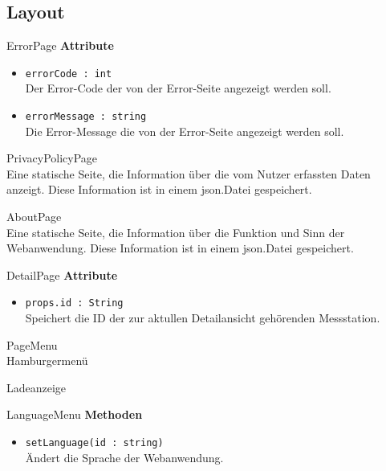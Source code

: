 \subsection{Layout}

    \begin{Class}{ErrorPage}
        \textbf{Attribute}
        \begin{itemize}
            \item \texttt{errorCode : int}
            \\Der Error-Code der von der Error-Seite angezeigt werden soll.
            \item \texttt{errorMessage : string}
            \\Die Error-Message die von der Error-Seite angezeigt werden soll.
        \end{itemize}
    \end{Class}

    \begin{Class}{PrivacyPolicyPage}
       \\Eine statische Seite, die Information über die vom Nutzer erfassten Daten anzeigt. Diese Information ist in einem json.Datei gespeichert.
    \end{Class}

    \begin{Class}{AboutPage}
       \\Eine statische Seite, die Information über die Funktion und Sinn der Webanwendung. Diese Information ist in einem json.Datei gespeichert.
    \end{Class}

    \begin{Class}{DetailPage}
        \textbf{Attribute}
        \begin{itemize}
            \item \texttt{props.id : String}
            \\Speichert die ID der zur aktullen Detailansicht gehörenden Messstation.
        \end{itemize}
    \end{Class}

    \begin{Class}{PageMenu}
            \\Hamburgermenü
    \end{Class}

    \begin{Class}{Ladeanzeige}
    \end{Class}

    \begin{Class}{LanguageMenu}
        \textbf{Methoden}
        \begin{itemize}
            \item \texttt{setLanguage(id : string)}
            \\ Ändert die Sprache der Webanwendung.
        \end{itemize}
    \end{Class}

   
